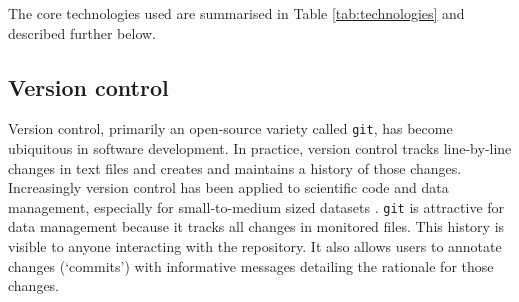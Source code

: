 \documentclass[a4paper,11pt]{article}
\begin{document}
The core technologies used are summarised in Table \ref{tab:technologies} and described further below.

\subsection{Version control}


Version control, primarily an open-source variety called \texttt{git}, has become ubiquitous in software development. In practice, version control tracks line-by-line changes in text files and creates and maintains a history of those changes. Increasingly version control has been applied to scientific code and data management, especially for small-to-medium sized datasets \citep{Ram-2013, Perkel-2016}. \texttt{git} is attractive for data management because it tracks all changes in monitored files. This history is visible to anyone interacting with the repository. It also allows users to annotate changes (`commits') with informative messages detailing the rationale for those changes.
  
\end{document}
